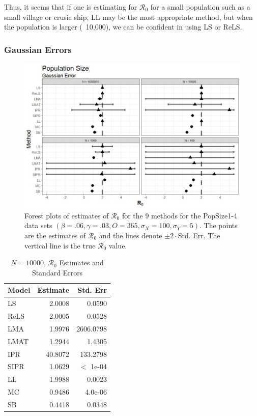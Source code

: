 \documentclass[12pt]{article}
\newcommand{\xxsir}{\ensuremath{9} } %
\newcommand{\rr}{\ensuremath{\mathcal{R}_0}}
\begin{document}
Thus, it seems that if one is estimating for $\rr$ for a small population such as a small village or crusie ship, LL may be the most appropriate method, but when the population is larger (~10,000), we can be confident in using LS or ReLS.

\subsubsection{Gaussian Errors}

\begin{figure}[H]
	\centering
	\includegraphics[scale=0.5]{images/popsize_n.jpeg}
	\caption{Forest plots of estimates of $\rr$ for the \xxsir methods for the PopSize1-4 data sets $(\beta=.06, \gamma=.03, O=365, \sigma_X=100, \sigma_Y=5)$.  The points are the estimates of $\rr$ and the lines denote $\pm 2\cdot $Std. Err.  The vertical line is the true $\rr$ value.}\label{fig:inits-res2}
\end{figure}

\begin{table}[H]
	
	\centering
	\begin{tabular}[t]{l|r|r}
		\hline
		Model & Estimate & Std. Err\\
		\hline
		LS & 2.0008 & 0.0590\\
		\hline
		ReLS & 2.0005 & 0.0528\\
		\hline
		LMA & 1.9976 & 2606.0798\\
		\hline
		LMAT & 1.2944 & 1.4305\\
		\hline
		IPR & 40.8072 & 133.2798\\
		\hline
		SIPR & 1.0629 &  $<$ 1e-04\\
		\hline
		LL & 1.9988 & 0.0023\\
		\hline
		MC & 0.9486 & 4.0e-06\\
		\hline
		SB & 0.4418 & 0.0348\\
		\hline
	\end{tabular}
\caption{$N = 10000$, $\rr$ Estimates and Standard Errors}\label{tab:n1-res2}
\end{table}
\end{document}
